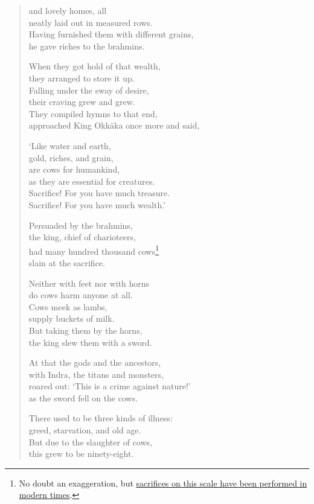 \documentclass[12pt,openany]{book}%
\begin{document}
\begin{verse}
and lovely homes, all \\
neatly laid out in measured rows. \\
Having furnished them with different grains, \\
he gave riches to the brahmins. 

When they got hold of that wealth, \\
they arranged to store it up. \\
Falling under the sway of desire, \\
their craving grew and grew. \\
They compiled hymns to that end, \\
approached King \textsanskrit{Okkāka} once more and said, 

‘Like water and earth, \\
gold, riches, and grain, \\
are cows for humankind, \\
as they are essential for creatures. \\
Sacrifice! For you have much treasure. \\
Sacrifice! For you have much wealth.’ 

Persuaded by the brahmins, \\
the king, chief of charioteers, \\
had many hundred thousand cows\footnote{No doubt an exaggeration, but \href{https://en.wikipedia.org/wiki/Gadhimai\_festival}{sacrifices on this scale have been performed in modern times}. } \\
slain at the sacrifice. 

Neither with feet nor with horns \\
do cows harm anyone at all. \\
Cows meek as lambs, \\
supply buckets of milk. \\
But taking them by the horns, \\
the king slew them with a sword. 

At that the gods and the ancestors, \\
with Indra, the titans and monsters, \\
roared out: ‘This is a crime against nature!’ \\
as the sword fell on the cows. 

There used to be three kinds of illness: \\
greed, starvation, and old age. \\
But due to the slaughter of cows, \\
this grew to be ninety-eight. 


\end{verse}
\end{document}
